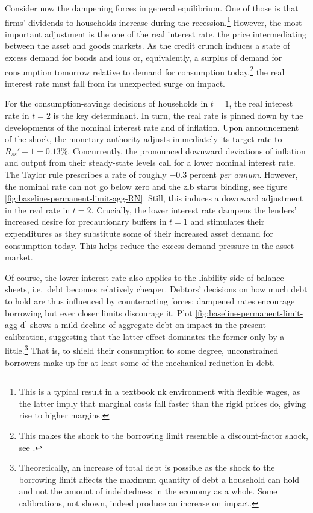 \documentclass[a4paper,12pt]{article} %
\numberwithin{equation}{section} %
\numberwithin{figure}{section}
\numberwithin{table}{section}
\begin{document}
Consider now the dampening forces in general equilibrium. One of those is that firms' dividends to households increase during the recession.\footnote{This is a typical result in a textbook \Gls{nk} environment with flexible wages, as the latter imply that marginal costs fall faster than the rigid prices do, giving rise to higher margins.} However, the most important adjustment is the one of the real interest rate, the price intermediating between the asset and goods markets. As the credit crunch induces a state of excess demand for bonds and \Gls{iou}s or, equivalently, a surplus of demand for consumption tomorrow relative to demand for consumption today,\footnote{This makes the shock to the borrowing limit resemble a discount-factor shock, see \textcite{kv2018}.} the real interest rate must fall from its unexpected surge on impact.

For the consumption-savings decisions of households in $t=1$, the real interest rate in $t=2$ is the key determinant. In turn, the real rate is pinned down by the developments of the nominal interest rate and of inflation. Upon announcement of the shock, the monetary authority adjusts immediately its target rate to $R_{ss}' - 1 = 0.13\%$. Concurrently, the pronounced downward deviations of inflation and output from their steady-state levels call for a lower nominal interest rate. The Taylor rule prescribes a rate of roughly $-0.3$ percent \textit{per annum}. However, the nominal rate can not go below zero and the \Gls{zlb} starts binding, see figure \ref{fig:baseline-permanent-limit-agg-RN}. Still, this induces a downward adjustment in the real rate in $t=2$. Crucially, the lower interest rate dampens the lenders' increased desire for precautionary buffers in $t=1$ and stimulates their expenditures as they substitute some of their increased asset demand for consumption today. This helps reduce the excess-demand pressure in the asset market. 

Of course, the lower interest rate also applies to the liability side of balance sheets, i.e.~debt becomes relatively cheaper. Debtors' decisions on how much debt to hold are thus influenced by counteracting forces: dampened rates encourage borrowing but ever closer limits discourage it. Plot \ref{fig:baseline-permanent-limit-agg-d} shows a mild decline of aggregate debt on impact in the present calibration, suggesting that the latter effect dominates the former only by a little.\footnote{Theoretically, an increase of total debt is possible as the shock to the borrowing limit affects the maximum quantity of debt a household can hold and not the amount of indebtedness in the economy as a whole. Some calibrations, not shown, indeed produce an increase on impact.} That is, to shield their consumption to some degree, unconstrained borrowers make up for at least some of the mechanical reduction in debt. 
\end{document}
